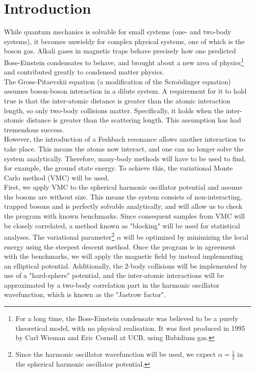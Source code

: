 \documentclass[english, a4paper]{article}
\begin{document}
\section{Introduction}
While quantum mechanics is solvable for small systems (one- and two-body systems), it becomes unwieldy for complex physical systems, one of which is the boson gas. Alkali gases in magnetic traps behave precisely how one predicted Bose-Einstein condensates to behave, and brought about a new area of physics\footnote{For a long time, the Bose-Einstein condensate was believed to be a purely theoretical model, with no physical realisation. It was first produced in 1995 by Carl Wieman and Eric Cornell at UCB, using Rubidium gas.} and contributed greatly to condensed matter physics.\\
The Gross-Pitaevskii equation (a modification of the Scro\"odinger equation) assumes boson-boson interaction in a dilute system. A requirement for it to hold true is that the inter-atomic distance is greater than the atomic interaction length, so only two-body collisions matter. Specifically, it holds when the inter-atomic distance is greater than the scattering length. This assumption has had tremendous success.\\
However, the introduction of a Feshbach resonance allows another interaction to take place. This means the atoms now interact, and one can no longer solve the system analytically. 
Therefore, many-body methods will have to be used to find, for example, the ground state energy. 
To achieve this, the variational Monte Carlo method (VMC) will be used.\\
First, we apply VMC to the spherical harmonic oscillator potential and assume the bosons are without size. 
This means the system consists of non-interacting, trapped bosons and is perfectly solvable analytically, and will allow us to check the program with known benchmarks. 
Since consequent samples from VMC will be closely correlated, a method known as "blocking" will be used for statistical analyses. 
The variational parameter\footnote{Since the harmonic oscillator wavefunction will be used, we expect $\alpha = \frac{1}{2}$ in the spherical harmonic oscillator potential.} $\alpha$ will be optimized by minimizing the local energy using the steepest descent method. 
Once the program is in agreement with the benchmarks, we will apply the magnetic field by instead implementing an elliptical potential. 
Additionally, the 2-body collisions will be implemented by use of a "hard-sphere" potential, and the inter-atomic interactions will be approximated by a two-body correlation part in the harmonic oscillator wavefunction, which is known as the "Jastrow factor". 
\end{document}
